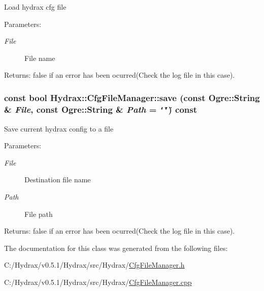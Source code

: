 Load hydrax cfg file \begin{Desc}
\item[Parameters:]
\begin{description}
\item[{\em File}]File name \end{description}
\end{Desc}
\begin{Desc}
\item[Returns:]false if an error has been ocurred(Check the log file in this case). \end{Desc}
\hypertarget{class_hydrax_1_1_cfg_file_manager_5bdea43e50f5a1662e2dc80e68e0d8a6}{
\subsubsection[{save}]{\setlength{\rightskip}{0pt plus 5cm}const bool Hydrax::CfgFileManager::save (const Ogre::String \& {\em File}, \/  const Ogre::String \& {\em Path} = {\tt \char`\"{}\char`\"{}}) const}}
\label{class_hydrax_1_1_cfg_file_manager_5bdea43e50f5a1662e2dc80e68e0d8a6}


Save current hydrax config to a file \begin{Desc}
\item[Parameters:]
\begin{description}
\item[{\em File}]Destination file name \item[{\em Path}]File path \end{description}
\end{Desc}
\begin{Desc}
\item[Returns:]false if an error has been ocurred(Check the log file in this case). \end{Desc}


The documentation for this class was generated from the following files:\begin{CompactItemize}
\item 
C:/Hydrax/v0.5.1/Hydrax/src/Hydrax/\hyperlink{_cfg_file_manager_8h}{CfgFileManager.h}\item 
C:/Hydrax/v0.5.1/Hydrax/src/Hydrax/\hyperlink{_cfg_file_manager_8cpp}{CfgFileManager.cpp}\end{CompactItemize}

